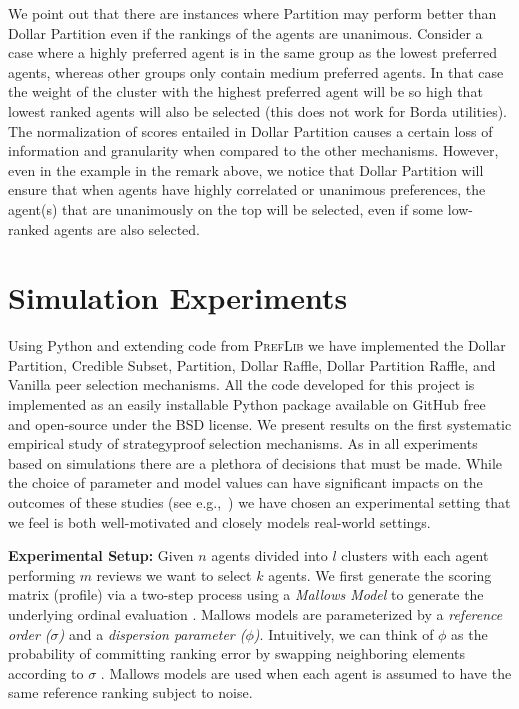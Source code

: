 \documentclass[letterpaper]{article}
\begin{document}
We point out that there are instances where Partition may perform better than Dollar Partition even if the rankings of the agents are unanimous. Consider a case where a highly preferred agent is in the same group as the lowest preferred agents, whereas other groups only contain medium preferred agents. In that case the weight of the cluster with the highest preferred agent will be so high that lowest ranked agents will also be selected (this does not work for Borda utilities).
The normalization of scores entailed in Dollar Partition causes a certain loss of information and granularity when compared to the other mechanisms.
However, even in the example in the remark above, we notice that Dollar Partition will ensure that when agents have highly correlated or unanimous preferences, the agent(s) that are unanimously on the top will be selected, even if some low-ranked agents are also selected.










\section{Simulation Experiments}

Using Python and extending code from \textsc{PrefLib} \cite{MaWa13a} we have implemented the Dollar Partition, Credible Subset, Partition, Dollar Raffle, Dollar Partition Raffle, and Vanilla peer selection mechanisms. All the code developed for this project is implemented as an easily installable Python package available on GitHub free and open-source under the BSD license.
We present results on the first systematic empirical study of strategyproof selection mechanisms. As in all experiments based on simulations there are a plethora of decisions that must be made.
While the choice of parameter and model values can have significant impacts on the outcomes of these studies (see e.g.,~\cite{PRM13a}) we have chosen an experimental setting that we feel is both well-motivated and closely models real-world settings.

\smallskip
\noindent
\textbf{Experimental Setup:}
Given $n$ agents divided into $l$ clusters with each agent performing $m$ reviews we want to select $k$ agents. We first generate the scoring matrix (profile) via a two-step process
using a \emph{Mallows Model} to generate the underlying ordinal evaluation \cite{Mall57a}. Mallows models are parameterized by a \emph{reference order ($\sigma$)} and a \emph{dispersion parameter ($\phi$)}.
Intuitively, we can think of $\phi$ as the probability of committing ranking error by swapping neighboring elements according to $\sigma$ \cite{LuBo11a}. %
Mallows models are used when each agent is assumed to have the same reference ranking subject to noise.
\end{document}
